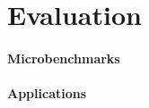\section{Evaluation}
\label{sec:evaluation}


\paragraph{Microbenchmarks}



\paragraph{Applications}




